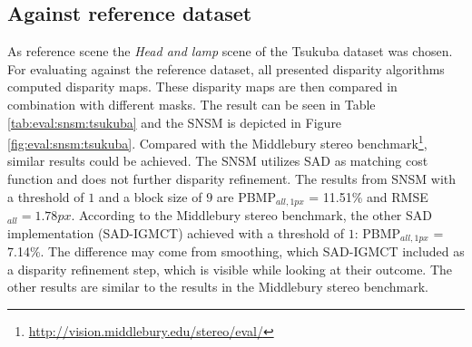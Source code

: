 \subsection{Against reference dataset}

As reference scene the \textit{Head and lamp} scene of the Tsukuba dataset was chosen.
For evaluating against the reference dataset, all presented disparity algorithms computed disparity maps.
These disparity maps are then compared in combination with different masks.
The result can be seen in Table \ref{tab:eval:snsm:tsukuba} and the SNSM is depicted in Figure \ref{fig:eval:snsm:tsukuba}.
Compared with the Middlebury stereo benchmark\footnote{\url{http://vision.middlebury.edu/stereo/eval/}}, similar results could be achieved.
\newline\newline\noindent The SNSM utilizes SAD as matching cost function and does not further disparity refinement.
The results from SNSM with a threshold of $1$ and a block size of $9$ are PBMP$_{all,1px}$ = 11.51\% and RMSE$_{all} = 1.78px$.
According to the Middlebury stereo benchmark, the other SAD implementation (SAD-IGMCT) \citep{ambrosch2010accurate} achieved with a threshold of $1$: PBMP$_{all,1px}$ = 7.14\%.
The difference may come from smoothing, which SAD-IGMCT included as a disparity refinement step, which is visible while looking at their outcome.
The other results are similar to the results in the Middlebury stereo benchmark.

\begin{table}[h!]
\centering
{}
\caption[Result table for reference dataset]{Result table for reference dataset}
\label{tab:eval:snsm:tsukuba}
\end{table}


